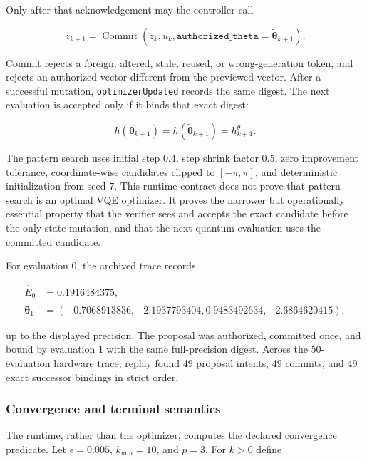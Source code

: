 Only after that acknowledgement may the controller call

\begin{equation}
  z_{k+1}=\operatorname{Commit}
  (z_k,u_k,\texttt{authorized\_theta}=\widetilde{\boldsymbol{\theta}}_{k+1}).
  \label{eq:rv-commit}
\end{equation}

Commit rejects a foreign, altered, stale, reused, or wrong-generation token,
and rejects an authorized vector different from the previewed vector.  After a
successful mutation, \texttt{optimizerUpdated} records the same digest.  The
next evaluation is accepted only if it binds that exact digest:

\begin{equation}
  h(\boldsymbol{\theta}_{k+1})
  =h(\widetilde{\boldsymbol{\theta}}_{k+1})
  =h^{\theta}_{k+1}.
  \label{eq:rv-theta-continuity}
\end{equation}

The pattern search uses initial step $0.4$, step shrink factor $0.5$, zero
improvement tolerance, coordinate-wise candidates clipped to $[-\pi,\pi]$,
and deterministic initialization from seed $7$.  This runtime contract does
not prove that pattern search is an optimal VQE optimizer.  It proves the
narrower but operationally essential property that the verifier sees and
accepts the exact candidate before the only state mutation, and that the next
quantum evaluation uses the committed candidate.

For evaluation $0$, the archived trace records

\begin{align}
  \widehat{E}_0 &= 0.1916484375,\nonumber\\
  \widetilde{\boldsymbol{\theta}}_1
    &=(-0.7068913836,-2.1937793404,0.9483492634,-2.6864620415),
  \label{eq:rv-first-proposal}
\end{align}

up to the displayed precision.  The proposal was authorized, committed once,
and bound by evaluation $1$ with the same full-precision digest.  Across the
50-evaluation hardware trace, replay found 49 proposal intents, 49 commits,
and 49 exact successor bindings in strict order.

\subsubsection{Convergence and terminal semantics}

The runtime, rather than the optimizer, computes the declared convergence
predicate.  Let $\epsilon=0.005$, $k_{\min}=10$, and $p=3$.  For $k>0$ define

